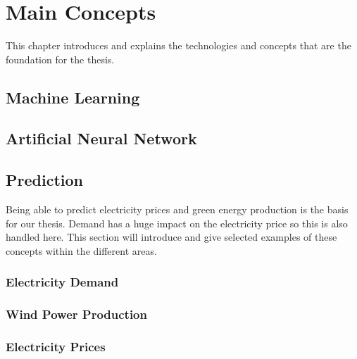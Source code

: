 \documentclass[twoside,11pt,openright]{report}
\begin{document}

\chapter{Main Concepts}
This chapter introduces and explains the technologies and concepts that are the foundation for the thesis.
\label{ch:foundations}
\section{Machine Learning}
\label{sec:machineLearning}


\newpage
\section{Artificial Neural Network}
\label{sec:annSection}


\newpage
\section{Prediction}
\label{sec:predictionSection}
Being able to predict electricity prices and green energy production is the basis for our thesis. Demand has a huge impact on the electricity price so this is also handled here. This section will introduce and give selected examples of these concepts within the different areas. 

\subsection{Electricity Demand}
\label{sec:ElectricityDemand}


\subsection{Wind Power Production}


\subsection{Electricity Prices}
\label{sec:electriciyPrices}

\end{document}
